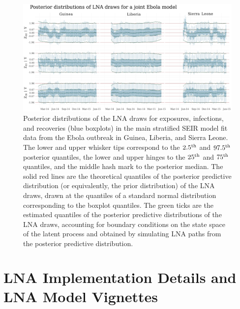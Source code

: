 \begin{figure}[htbp]
	\begin{fullpage}
		\centering
		\includegraphics[width=\linewidth]{figures/ebola_joint_drawplots}
		\caption[Posterior distributions of LNA draws for the main stratified SEIR model fit to data from the West Africa Ebola outbreak.]{Posterior distributions of the LNA draws for exposures, infections, and recoveries (blue boxplots) in the main stratified SEIR model fit data from the Ebola outbreak in Guinea, Liberia, and Sierra Leone. The lower and upper whisker tips correspond to the $ 2.5^{\mathrm{th}} $ and $ 97.5^{\mathrm{th}} $ posterior quantiles, the lower and upper hinges to the $ 25^{\mathrm{th}} $ and $ 75^{\mathrm{th}} $ quantiles, and the middle hash mark to the posterior median. The solid red lines are the theoretical quantiles of the posterior predictive distribution (or equivalently, the prior distribution) of the LNA draws, drawn at the quantiles of a standard normal distribution corresponding to the boxplot quantiles. The green ticks are the estimated quantiles of the posterior predictive distributions of the LNA draws, accounting for boundary conditions on the state space of the latent process and obtained by simulating LNA paths from the posterior predictive distribution.}
		\label{fig:ebola_joint_drawplots}
	\end{fullpage}
\end{figure}

\newpage
\section{LNA Implementation Details and LNA Model Vignettes}
\label{sec:lna_implementation_vignettes}
